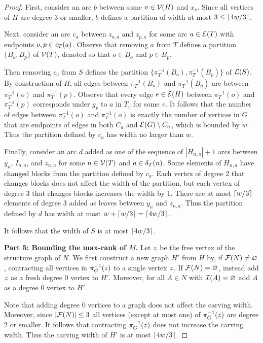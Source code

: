 \begin{proof}
First, consider an arc $b$ between some $v \in \mathcal{V}(H)$ and $x_v$. Since all vertices of $H$ are degree 3 or smaller, $b$ defines a partition of width at most $3 \leq \lceil4w/3\rceil$.

Next, consider an arc $c_a$ between $z_{o,a}$ and $z_{p,a}$ for some arc $a \in \mathcal{E}(T)$ with endpoints $o, p \in \epsilon_{T}(a)$.
Observe that removing $a$ from $T$ defines a partition $\{B_o, B_p\}$ of $\mathcal{V}(T)$, denoted so that $o \in B_o$ and $p \in B_p$. 

Then removing $c_a$ from $S$ defines the partition $\{ \pi_T^{-1}(B_o), \pi_T^{-1}(B_p) \}$ of $\mathcal{L}(S)$. By construction of $H$, all edges between $\pi_T^{-1}(B_o)$ and $\pi_T^{-1}(B_p)$ are between $\pi_T^{-1}(o)$ and $\pi_T^{-1}(p)$. Observe that every edge $e \in \mathcal{E}(H)$ between $\pi_T^{-1}(o)$ and $\pi_T^{-1}(p)$ corresponds under $g_v$ to $a$ in $T_v$ for some $v$. It follows that the number of edges between $\pi_T^{-1}(o)$ and $\pi_T^{-1}(o)$ is exactly the number of vertices in $G$ that are endpoints of edges in both $C_a$ and $\mathcal{E}(G) \setminus C_a$, which is bounded by $w$. Thus the partition defined by $c_a$ has width no larger than $w$. 

Finally, consider an arc $d$ added as one of the sequence of $|H_{n,a}|+1$ arcs between $y_n$, $I_{n,a}$, and $z_{n,a}$ for some $n \in \mathcal{V}(T)$ and $a \in \delta_{T}(n)$. Some elements of $H_{n,a}$ have changed blocks from the partition defined by $c_a$. Each vertex of degree 2 that changes blocks does not affect the width of the partition, but each vertex of degree 3 that changes blocks increases the width by 1. There are at most $\lceil w/3\rceil$ elements of degree 3 added as leaves between $y_n$ and $z_{n,a}$. Thus the partition defined by $d$ has width at most $w + \lceil w/3\rceil = \lceil4w/3\rceil$.

It follows that the width of $S$ is at most $\lceil4w/3\rceil$.

\textbf{Part 5: Bounding the max-rank of $M$.} Let $z$ be the free vertex of the structure graph of $N$. We first construct a new graph $H'$ from $H$ by, if $\mathcal{F}(N) \neq \varnothing$, contracting all vertices in $\pi_G^{-1}(z)$ to a single vertex $z$. If $\mathcal{F}(N) = \varnothing$, instead add $z$ as a fresh degree 0 vertex to $H'$. Moreover, for all $A \in N$ with $\mathcal{I}(A) = \varnothing$ add $A$ as a degree 0 vertex to $H'$. 

Note that adding degree 0 vertices to a graph does not affect the carving width. Moreover, since $|\mathcal{F}(N)| \leq 3$ all vertices (except at most one) of $\pi_G^{-1}(z)$ are degree 2 or smaller. It follows that contracting $\pi_G^{-1}(z)$ does not increase the carving width. Thus the carving width of $H'$ is at most $\lceil4w/3\rceil$.


\end{proof}
